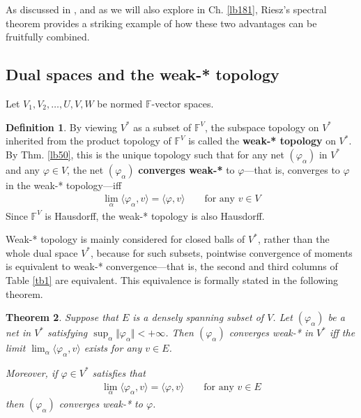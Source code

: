 \documentclass[12pt,b5paper,notitlepage]{article}
\theoremstyle{definition}
\newtheorem{df}{Definition}[subsection]
\theoremstyle{plain}
\newtheorem{thm}[df]{Theorem}
\newcommand{\bk}[1]{\langle {#1}\rangle}
\newcommand{\Fbb}{\mathbb F}
\numberwithin{equation}{section}
\begin{document}
As discussed in \cite[Sec. 25.8, 25.9]{Gui-A}, and as we will also explore in Ch. \ref{lb181}, Riesz’s spectral theorem provides a striking example of how these two advantages can be fruitfully combined.



\subsection{Dual spaces and the weak-* topology}


Let $V_1,V_2,\dots,U,V,W$ be normed $\Fbb$-vector spaces.


\begin{df}
By viewing $V^*$ as a subset of $\Fbb^V$, the subspace topology on $V^*$ inherited from the product topology of $\Fbb^V$ is called the \textbf{weak-* topology}  on $V^*$. By Thm. \ref{lb50}, this is the unique topology such that for any net $(\varphi_\alpha)$ in $V^*$ and any $\varphi\in V$, the net $(\varphi_\alpha)$ \textbf{converges weak-*}  to $\varphi$---that is, converges to $\varphi$ in the weak-* topology---iff 
\begin{align}\label{eq49}
\lim_\alpha\bk{\varphi_\alpha,v}=\bk{\varphi,v}\qquad\text{for any }v\in V
\end{align}
Since $\Fbb^V$ is Hausdorff, the weak-* topology is also Hausdorff.
\end{df}



Weak-* topology is mainly considered for closed balls of $V^*$, rather than the whole dual space $V^*$, because for such subsets, pointwise convergence of moments is equivalent to weak-* convergence---that is, the second and third columns of Table \ref{tb1} are equivalent. This equivalence is formally stated in the following theorem.

\begin{thm}\label{lb80}
Suppose that $E$ is a densely spanning subset of $V$. Let $(\varphi_\alpha)$ be a net in $V^*$ satisfying $\sup_\alpha\Vert\varphi_\alpha\Vert<+\infty$. Then $(\varphi_\alpha)$ converges weak-* in $V^*$ iff the limit $\lim_\alpha\bk{\varphi_\alpha,v}$ exists for any $v\in E$. 

Moreover, if  $\varphi\in V^*$ satisfies that
\begin{align*}
\lim_\alpha\bk{\varphi_\alpha,v}=\bk{\varphi,v}\qquad\text{for any }v\in E
\end{align*}
then $(\varphi_\alpha)$ converges weak-* to $\varphi$.
\end{thm}
\end{document}
